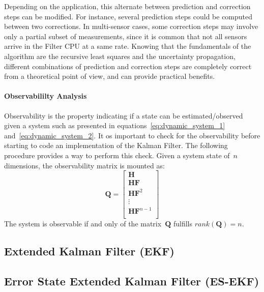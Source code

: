 Depending on the application, this alternate between prediction and correction steps can be modified. For instance, several prediction steps could be computed between two corrections. In multi-sensor cases, some correction steps may involve only a partial subset of measurements, since it is common that not all sensors arrive in the Filter CPU at a same rate. Knowing that the fundamentals of the algorithm are the recursive least squares and the uncertainty propagation, different combinations of prediction and correction steps are completely correct from a theoretical point of view, and can provide practical benefits.

\paragraph{Observabililty Analysis} Observability is the property indicating if a state can be estimated/observed given a system such as presented in equations~\ref{eq:dynamic_system_1} and~\ref{eq:dynamic_system_2}. It os important to check for the observability before starting to code an implementation of the Kalman Filter. The following procedure provides a way to perform this check. Given a system state of~$n$ dimensions, the observability matrix is mounted as:
\begin{equation}
\mathbf{Q} = 
\left[
 \begin{array}{c}
  \mathbf{H}\\
  \mathbf{H}\mathbf{F}\\
  \mathbf{H}\mathbf{F}^2\\
  \vdots\\
  \mathbf{H}\mathbf{F}^{n-1}\\
 \end{array}
\right]
\end{equation}
The system is observable if and only of the matrix~$\mathbf{Q}$ fulfills $rank(\mathbf{Q})=n$.



\subsection{Extended Kalman Filter (EKF)}

\subsection{Error State Extended Kalman Filter (ES-EKF)}
